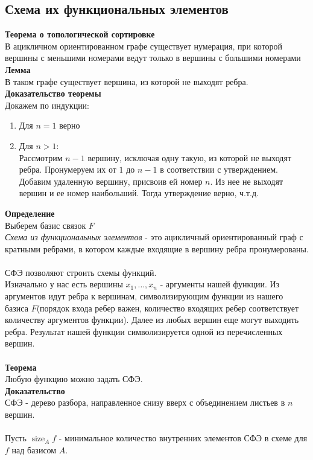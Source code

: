 \documentclass[12pt]{article}
\begin{document}
\subsection{Схема их функциональных элементов}
\textbf{Теорема о топологической сортировке}\\
В ацикличном ориентированном графе существует нумерация, при которой вершины с меньшими номерами ведут только в вершины с большими номерами\\
\textbf{Лемма}\\
В таком графе существует вершина, из которой не выходят ребра.\\
\textbf{Доказательство теоремы}\\
Докажем по индукции:
\begin{enumerate}
    \item Для $n=1$ верно
    \item Для $n > 1$:\\
    Рассмотрим $n-1$ вершину, исключая одну такую, из которой не выходят ребра. Пронумеруем их от $1$ до $n-1$ в соответствии с утверждением. Добавим удаленную вершину, присвоив ей номер $n$. Из нее не выходят вершин и ее номер наибольший. Тогда утверждение верно, ч.т.д.
\end{enumerate}
\textbf{Определение}\\
Выберем базис связок $F$\\ 
\textit{Схема из функциональных элементов} - это ацикличный ориентированный граф с кратными ребрами, в котором каждые входящие в вершину ребра пронумерованы.\\\\
СФЭ позволяют строить схемы функций.\\
Изначально у нас есть вершины $x_1,\ldots,x_n$ - аргументы нашей функции. Из аргументов идут ребра к вершинам, символизирующим функции из нашего базиса $F$(порядок входа ребер важен, количество входящих ребер соответствует количеству аргументов функции). Далее из любых вершин еще могут выходить ребра. Результат нашей функции символизируется одной из перечисленных вершин.\\\\
\textbf{Теорема}\\
Любую функцию можно задать СФЭ.\\
\textbf{Доказательство}\\
СФЭ - дерево разбора, направленное снизу вверх с объединением листьев в $n$ вершин.\\\\
Пусть $\operatorname{size}_A f$ - минимальное количество внутренних элементов СФЭ в схеме для $f$ над базисом $A$.\\
\end{document}
